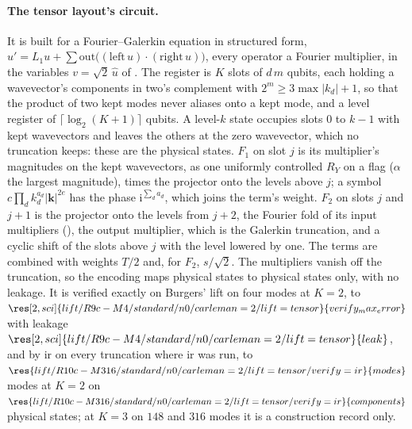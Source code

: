 \paragraph{The tensor layout's circuit.} It is built for a Fourier--Galerkin equation in structured form, $u'=L_1u+\sum\mathrm{out}\bigl((\mathrm{left}\,u)\cdot(\mathrm{right}\,u)\bigr)$, every operator a Fourier multiplier, in the variables $v=\sqrt2\,\hat u$ of . The register is $K$ slots of $d\,m$ qubits, each holding a wavevector's components in two's complement with $2^m\ge3\max|k_d|+1$, so that the product of two kept modes never aliases onto a kept mode, and a level register of $\lceil\log_2(K+1)\rceil$ qubits. A level-$k$ state occupies slots $0$ to $k-1$ with kept wavevectors and leaves the others at the zero wavevector, which no truncation keeps: these are the physical states. $F_1$ on slot $j$ is its multiplier's magnitudes on the kept wavevectors, as one uniformly controlled $R_Y$ on a flag ($\alpha$ the largest magnitude), times the projector onto the levels above $j$; a symbol $c\prod_dk_d^{a_d}|\mathbf k|^{2e}$ has the phase $\mathrm{i}^{\sum_da_d}$, which joins the term's weight. $F_2$ on slots $j$ and $j+1$ is the projector onto the levels from $j+2$, the Fourier fold of its input multipliers (), the output multiplier, which is the Galerkin truncation, and a cyclic shift of the slots above $j$ with the level lowered by one. The terms are combined with weights $T/2$ and, for $F_2$, $s/\sqrt2$. The multipliers vanish off the truncation, so the encoding maps physical states to physical states only, with no leakage. It is verified exactly on Burgers' lift on four modes at $K=2$, to $\res[2,sci]{lift/R9c-M4/standard/n0/carleman=2/lift=tensor}{verify_max_error}$ with leakage $\res[2,sci]{lift/R9c-M4/standard/n0/carleman=2/lift=tensor}{leak}$, and by \gls{ir} on every truncation where \gls{ir} was run, to $\res{lift/R10c-M316/standard/n0/carleman=2/lift=tensor/verify=ir}{modes}$ modes at $K=2$ on $\res{lift/R10c-M316/standard/n0/carleman=2/lift=tensor/verify=ir}{components}$ physical states; at $K=3$ on $148$ and $316$ modes it is a construction record only.

